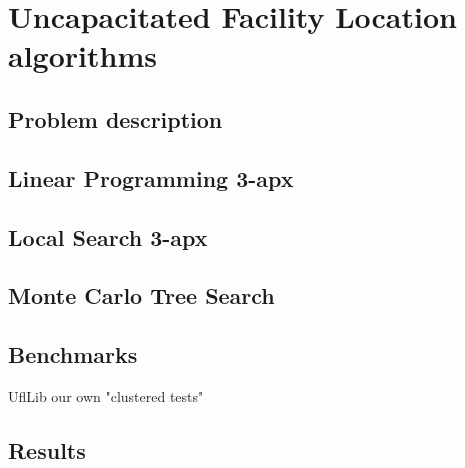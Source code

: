 \chapter{Uncapacitated Facility Location algorithms}

\section{Problem description}

\section{Linear Programming 3-apx}

\section{Local Search 3-apx}

\section{Monte Carlo Tree Search}

\section{Benchmarks}
UflLib our own "clustered tests"

\section{Results}

